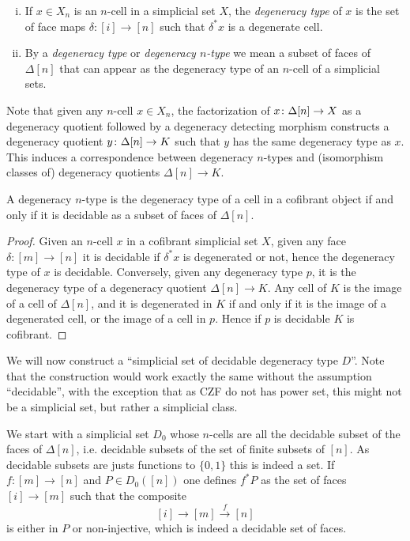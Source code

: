 \documentclass[reqno,10pt,a4paper,oneside,draft]{amsart}
\begin{document}
\begin{definition}\hfill
\begin{enumerate}[(i)]  
\item If $x \in X_n$ is an $n$-cell in a simplicial set $X$, the \emph{degeneracy type} of $x$ is the set of face maps $\delta:[i] \rightarrow [n]$ such that $\delta^* x$ is a degenerate cell.
\item By a \emph{degeneracy type} or \emph{degeneracy $n$-type} we mean a subset of faces of $\Delta[n]$ that can appear as the degeneracy type of an $n$-cell of a simplicial sets.
\end{enumerate}
\end{definition}

\medskip

Note that given any $n$-cell $x \in X_n$, the factorization of $x \colon \Delta[n] \rightarrow X$ as a degeneracy quotient followed by a degeneracy detecting morphism constructs a degeneracy quotient $y \colon \Delta[n] \rightarrow K$ such that $y$ has the same degeneracy type as $x$. This induces a correspondence between degeneracy $n$-types and (isomorphism classes of) degeneracy quotients $\Delta[n] \rightarrow K$. 

\begin{lemma} A degeneracy $n$-type is the degeneracy type of a cell in a cofibrant object  if and only if it is decidable as a subset of faces of $\Delta[n]$.
\end{lemma}


\begin{proof}
Given an $n$-cell $x$ in a cofibrant simplicial set $X$, given any face $\delta:[m] \rightarrow [n]$ it is decidable if $\delta^* x$ is degenerated or not, hence the degeneracy type of $x$ is decidable. Conversely, given any degeneracy type $p$, it is the degeneracy type of a degeneracy quotient $\Delta[n] \rightarrow K$. Any cell of $K$ is the image of a cell of $\Delta[n]$, and it is degenerated in $K$ if and only if it is the image of a degenerated cell, or the image of a cell in $p$. Hence if $p$ is decidable $K$ is cofibrant.
\end{proof}


We will now construct a ``simplicial set of decidable degeneracy type $D$''. Note that the construction would work exactly the same without the assumption ``decidable'', with the exception that as CZF do not has power set, this might not be a simplicial set, but rather a simplicial class.


 We start with a simplicial set $D_0$ whose $n$-cells are all the decidable subset of the faces of $\Delta[n]$, i.e. decidable subsets of the set of finite subsets of $[n]$. As decidable subsets are justs functions to $\{0,1\}$ this is indeed a set.  If $f : [m] \rightarrow [n]$ and $P \in D_0([n])$ one defines $f^* P$ as the set of faces  $[i] \rightarrow [m]$ such that the composite 
 \[
 [i] \rightarrow [m] \overset{f}{\rightarrow} [n]
 \] is either in $P$ or non-injective, which is indeed a decidable set of faces.
\end{document}
